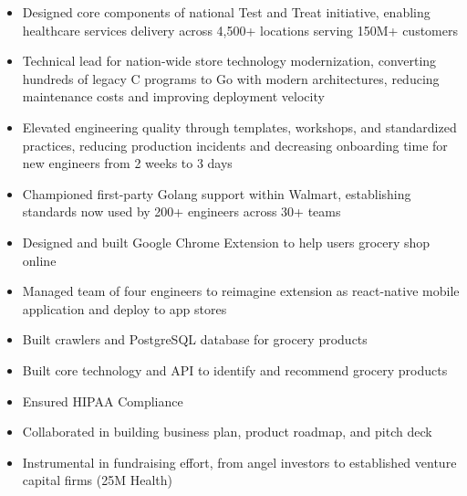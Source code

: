 \documentclass[10pt,a4paper,ragged2e,withhyper]{altacv}
\begin{document}
\begin{paracol}{2}

  \begin{itemize}
      \item Designed core components of national Test and Treat initiative, enabling healthcare services delivery across 4,500+ locations serving 150M+ customers
      \item Technical lead for nation-wide store technology modernization, converting hundreds of legacy C programs to Go with modern architectures, reducing maintenance costs and improving deployment velocity
      \item Elevated engineering quality through templates, workshops, and standardized practices, reducing production incidents and decreasing onboarding time for new engineers from 2 weeks to 3 days
      \item Championed first-party Golang support within Walmart, establishing standards now used by 200+ engineers across 30+ teams
  \end{itemize}
  
  \divider

  \begin{itemize}
    \item Designed and built Google Chrome Extension to help users grocery shop online
    \item Managed team of four engineers to reimagine extension as react-native mobile application and deploy to app stores
    \item Built crawlers and PostgreSQL database for grocery products
    \item Built core technology and API to identify and recommend grocery products
    \item Ensured HIPAA Compliance
    \item Collaborated in building business plan, product roadmap, and pitch deck
    \item Instrumental in fundraising effort, from angel investors to established venture capital firms (25M Health)
  \end{itemize}
  
  \divider
  

\end{paracol}
\end{document}

